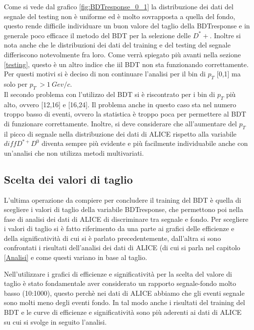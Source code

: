 Come si vede dal grafico \ref{fig:BDTresponse_0_1} la distribuzione dei dati del segnale del testing non è uniforme ed è molto sovrapposta a quella del fondo, questo rende difficile individuare un buon valore del taglio della BDTresponse e in generale poco efficace il metodo del BDT per la selezione delle $D^*+$. Inoltre si nota anche che le distribuzioni dei dati del training e del testing del segnale differiscono notevolmente fra loro. Come verrà spiegato più avanti nella sezione \ref{testing}, questo è un altro indice che iil BDT non sta funzionando correttamente. Per questi motivi si è deciso di non continuare l'analisi per il bin di $p_T$ [0,1] ma solo per $p_T \ > 1 \  Gev/c$. 
\\Il secondo problema con l'utilizzo del BDT si è riscontrato per i bin di $p_T$ più alto, ovvero [12,16] e [16,24].  Il problema anche in questo caso sta nel numero troppo basso di eventi, ovvero la statistica è troppo poca per permettere al BDT di funzionare correttamente. Inoltre, si deve considerare che all'aumentare del $p_T$ il picco di segnale nella distribuzione dei dati di ALICE rispetto alla variabile $diffD^{*+}D^0$ diventa sempre più evidente e più facilmente individuabile anche con un'analisi che non utilizza metodi multivariati. 




\subsection{Scelta dei valori di taglio}

L'ultima operazione da compiere per concludere il training del BDT è quella di scegliere i valori di taglio della variabile BDTresponse, che permettono poi nella fase di analisi dei dati di ALICE di discriminare tra segnale e fondo. Per scegliere i valori di taglio si è fatto riferimento da una parte ai grafici delle efficienze e della significatività di cui si è parlato precedentemente, dall'altra si sono confrontati i risultati dell'analisi dei dati di ALICE (di cui si parla nel capitolo \ref{Analisi} e come questi variano in base al taglio. 

Nell'utilizzare i grafici di efficienze e significatività per la scelta del valore di taglio è stato fondamentale aver considerato un rapporto segnale-fondo molto basso (10:1000), questo perchè nei dati di ALICE abbiamo che gli eventi segnale sono molti meno degli eventi fondo. In tal modo anche i risultati del training del BDT e le curve di efficienze e significatività sono più aderenti ai dati di ALICE su cui si svolge in seguito l'analisi. 

